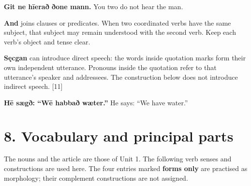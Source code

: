 \textbf{Git ne hīerað ðone mann.} You two do not hear the man.

\textbf{And} joins clauses or predicates. When two coordinated verbs have the same subject, that subject may remain understood with the second verb. Keep each verb’s object and tense clear.

\textbf{Sęcgan} can introduce direct speech: the words inside quotation marks form their own independent utterance. Pronouns inside the quotation refer to that utterance’s speaker and addressees. The construction below does not introduce indirect speech. [11]

\textbf{Hē sægð: “Wē habbað wæter.”} He says: “We have water.”

\section*{8. Vocabulary and principal parts}

The nouns and the article are those of Unit 1. The following verb senses and constructions are used here. The four entries marked \textbf{forms only} are practised as morphology; their complement constructions are not assigned.

